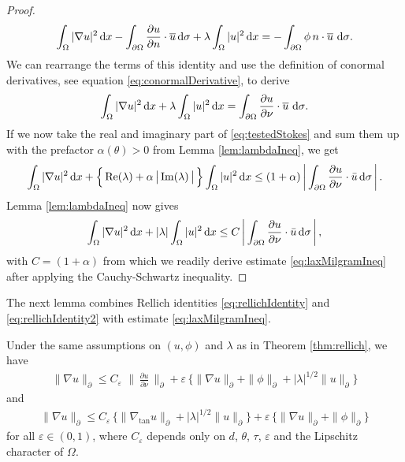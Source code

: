 \begin{proof}
  \begin{align*}
    \int_\Omega |\nabla u|^2 \, {\operatorname{d}\!{x}} - \int_{\partial\Omega} \frac{\partial u}{\partial n} \cdot \overline u \, {\operatorname{d}\!{\sigma}} + \lambda \int_\Omega |u|^2 \, {\operatorname{d}\!{x}} = - \int_{\partial\Omega}  \phi\, n \cdot \overline u \, \, {\operatorname{d}\!{\sigma}}.
  \end{align*}
  We can rearrange the terms of this identity and use the definition of conormal derivatives, see equation \eqref{eq:conormalDerivative}, to derive
  \begin{align}
    \label{eq:testedStokes}
    \int_\Omega |\nabla u|^2 \, {\operatorname{d}\!{x}} + \lambda \int_\Omega |u|^2 \, {\operatorname{d}\!{x}} = \int_{\partial\Omega} \frac{\partial u}{\partial \nu} \cdot \overline u \, \, {\operatorname{d}\!{\sigma}}.
  \end{align}
  If we now take the real and imaginary part of \eqref{eq:testedStokes} and sum them up with the prefactor $\alpha(\theta) > 0$ from Lemma \ref{lem:lambdaIneq}, we get
  \begin{align*}
    \int_\Omega |\nabla u|^2 \, {\operatorname{d}\!{x}} + \Big\{ \operatorname{Re}(\lambda) + \alpha\, \big|\operatorname{Im}(\lambda)\,\big|\, \Big\} \int_\Omega |u|^2 \, {\operatorname{d}\!{x}}
    \leq (1 + \alpha) \, \bigg| \int_{\partial\Omega} \frac{\partial u}{\partial \nu} \cdot \bar u \, {\operatorname{d}\!{\sigma}} \, \bigg|\,.
  \end{align*}
  Lemma \ref{lem:lambdaIneq} now gives
  \begin{align*}
    \int_\Omega |\nabla u|^2 \, {\operatorname{d}\!{x}} + |\lambda| \int_\Omega |u|^2 \, {\operatorname{d}\!{x}} \leq C\,  \bigg| \int_{\partial\Omega} \frac{\partial u}{\partial \nu} \cdot \bar u \, {\operatorname{d}\!{\sigma}}\, \bigg|\,,
  \end{align*}
  with $C = (1 + \alpha)$ from which we readily derive estimate \eqref{eq:laxMilgramIneq} after applying the Cauchy-Schwartz inequality.
\end{proof}

The next lemma combines Rellich identities \eqref{eq:rellichIdentity} and \eqref{eq:rellichIdentity2} with estimate \eqref{eq:laxMilgramIneq}.

\begin{lem}
  Under the same assumptions on $(u,\phi)$ and $\lambda$ as in Theorem \ref{thm:rellich}, we have
  \begin{align}
    \label{eq:gradEstimateRellich}
    \| \nabla u\|^{}_\partial \leq C_\varepsilon\, \,\Big\|\, \frac{\partial u}{\partial \nu} \, \Big\|^{}_\partial + \varepsilon \,\Big\{ \|\nabla u\|^{}_\partial + \|\phi\|^{}_\partial +  |\lambda|^{1/2} \| u\|^{}_\partial \Big\}
  \end{align}
  and
  \begin{align}
    \label{eq:gradEstimateRellich2}
    \|\nabla u\|^{}_\partial \leq C_\varepsilon\, \Big\{ \big\|\nabla_{\mathrm{tan}} u \big\|^{}_\partial + |\lambda|^{1/2} \| u\|^{}_\partial \Big\} + \varepsilon\, \Big\{ \|\nabla u\|^{}_\partial + \|\phi\|^{}_\partial \Big\}
  \end{align}
  for all $\varepsilon \in (0,1)$, where $C_\varepsilon$ depends only on $d$, $\theta$, $\tau$, $\varepsilon$ and the Lipschitz character of $\Omega$.
\end{lem}

